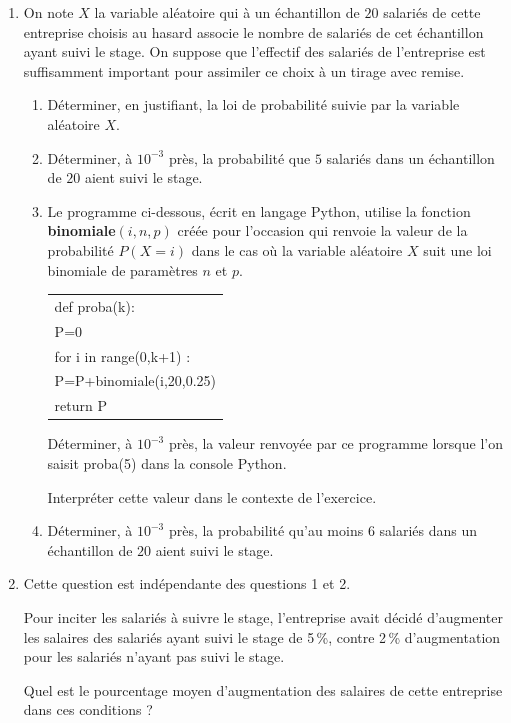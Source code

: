 \documentclass[10pt]{article}
\begin{document}
\begin{enumerate}[resume]
\item On note $X$ la variable aléatoire qui à un échantillon de $20$ salariés de cette entreprise choisis au hasard associe le nombre de salariés de cet échantillon ayant suivi le stage. On suppose que l'effectif des salariés de l'entreprise est suffisamment important pour assimiler ce choix à un tirage avec  remise.
	\begin{enumerate}
		\item Déterminer, en justifiant, la loi de probabilité suivie par la variable aléatoire $X$.
		\item Déterminer, à $10^{-3}$ près, la probabilité que $5$ salariés dans un échantillon de $20$ aient suivi le stage.
		\item Le programme ci-dessous, écrit en langage Python, utilise la fonction \textbf{binomiale$(i, n, p)$} créée pour l'occasion qui renvoie
la valeur de la probabilité $P(X = i)$ dans le cas où la variable aléatoire $X$ suit une loi binomiale de paramètres $n$ et $p$.

\begin{center}
\begin{tabular}{|l|}\hline
def proba(k):\\
\quad  P=0\\
\quad for i in range(0,k+1) :\\
\qquad P=P+binomiale(i,20,0.25)\\
\quad return P\\ \hline
\end{tabular}
\end{center}

Déterminer, à $10^{-3}$ près, la valeur renvoyée par ce programme lorsque l'on saisit proba(5) dans la console Python. 

Interpréter cette valeur dans le contexte de l'exercice.
		\item Déterminer, à $10^{-3}$ près, la probabilité qu'au moins $6$ salariés dans un échantillon de $20$ aient suivi le stage.
		\end{enumerate}	
\item Cette question est indépendante des questions 1 et 2.

Pour inciter les salariés à suivre le stage, l'entreprise avait décidé d'augmenter les salaires des salariés ayant suivi le stage de 5\,\%, contre 2\,\% d'augmentation pour les salariés n'ayant pas suivi le stage. 

Quel est le pourcentage moyen d'augmentation des salaires de cette entreprise dans ces conditions ?

\end{enumerate}

\bigskip
\end{document}
